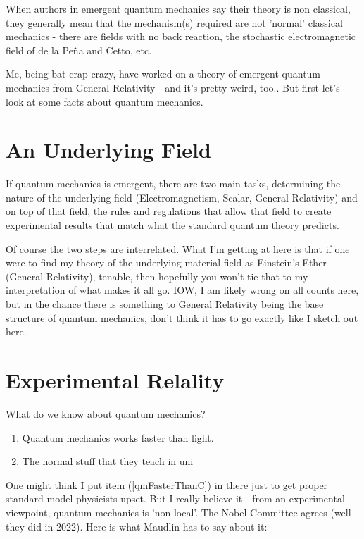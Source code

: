 \documentclass[../rzero]{subfiles}
\begin{document}
When authors in emergent quantum mechanics say their theory is non classical, they generally mean that the mechanism(s) required are not 'normal' classical mechanics - there are fields with no back reaction, the stochastic electromagnetic field of de la Peña and Cetto, etc.

Me, being bat crap crazy, have worked on a theory of emergent quantum mechanics from General Relativity - and it's pretty weird, too.\cite{Andersen2016}. But first let's look at some facts about quantum mechanics.

\section{An Underlying Field}
If quantum mechanics is emergent, there are two main tasks, determining the nature of the underlying field (Electromagnetism, Scalar, General Relativity) and on top of that field, the rules and regulations that allow that field to create experimental results that match what the standard quantum theory predicts. 

Of course the two steps are interrelated. What I'm getting at here is that if one were to find my theory of the underlying material field as Einstein's Ether\cite{Einstein1920} (General Relativity), tenable, then hopefully you won't tie that to my interpretation of what makes it all go. IOW, I am likely wrong on all counts here, but in the chance there is something to General Relativity being the base structure of quantum mechanics, don't think it has to go exactly like I sketch out here.

\section{Experimental Relality}
What do we know about quantum mechanics?

\begin{enumerate}
	\item{Quantum mechanics works faster than light.}\label{qmFasterThanC}
	\item{The normal stuff that they teach in uni}
\end{enumerate}

One might think I put item (\ref{qmFasterThanC}) in there just to get proper standard model physicists upset. But I really believe it -  from an experimental viewpoint, quantum mechanics is 'non local'. The Nobel Committee agrees\cite{AllNobelPrizes} (well they did in 2022). Here is what Maudlin has to say about it\cite{Maudlind}:
\end{document}
